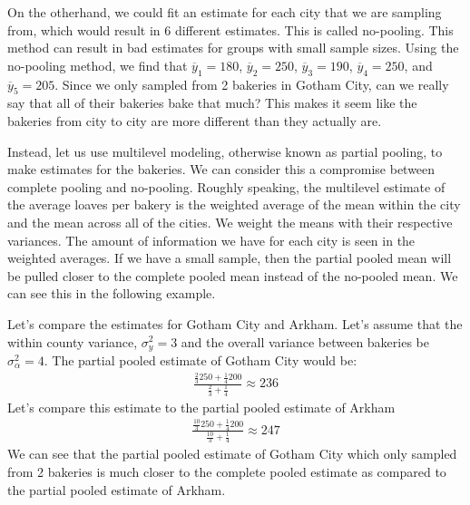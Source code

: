 \documentclass[12pt,twoside]{reedthesis}
\begin{document}
On the otherhand, we could fit an estimate for each city that we are sampling from, which would result in 6 different estimates. This is called no-pooling. This method can result in bad estimates for groups with small sample sizes. Using the no-pooling method, we find that \(\overline{y}_1 = 180\), \(\overline{y}_2 = 250\), \(\overline{y}_3 = 190\), \(\overline{y}_4 = 250\), and \(\overline{y}_5 = 205\). Since we only sampled from 2 bakeries in Gotham City, can we really say that all of their bakeries bake that much? This makes it seem like the bakeries from city to city are more different than they actually are.

Instead, let us use multilevel modeling, otherwise known as partial pooling, to make estimates for the bakeries. We can consider this a compromise between complete pooling and no-pooling. Roughly speaking, the multilevel estimate of the average loaves per bakery is the weighted average of the mean within the city and the mean across all of the cities. We weight the means with their respective variances. The amount of information we have for each city is seen in the weighted averages. If we have a small sample, then the partial pooled mean will be pulled closer to the complete pooled mean instead of the no-pooled mean. We can see this in the following example.

Let's compare the estimates for Gotham City and Arkham. Let's assume that the within county variance, \(\sigma^2_y = 3\) and the overall variance between bakeries be \(\sigma^2_\alpha=4\). The partial pooled estimate of Gotham City would be:
\[
\begin{aligned}
\frac{\frac{2}{3} 250 + \frac{1}{4} 200}{\frac{2}{3} + \frac{1}{4}} \approx 236
\end{aligned}
\]
Let's compare this estimate to the partial pooled estimate of Arkham
\[
\begin{aligned}
\frac{\frac{10}{3} 250 + \frac{1}{4} 200}{\frac{10}{3} + \frac{1}{4}} \approx 247
\end{aligned}
\]
We can see that the partial pooled estimate of Gotham City which only sampled from 2 bakeries is much closer to the complete pooled estimate as compared to the partial pooled estimate of Arkham.
\end{document}
